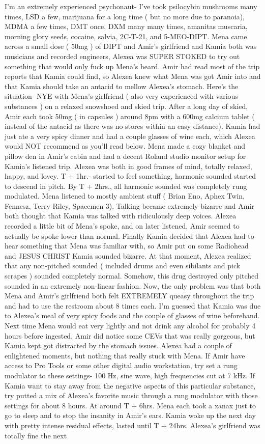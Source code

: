 \documentclass[12pt]{book}
\begin{document}
I'm an extremely experienced psychonaut- I've took psilocybin mushrooms many times, LSD a few, marijuana for a long time ( but no more due to paranoia), MDMA a few times, DMT once, DXM many many times, amanitas muscaria, morning glory seeds, cocaine, salvia, 2C-T-21, and 5-MEO-DIPT. Mena came across a small dose ( 50mg ) of DIPT and Amir's girlfriend and Kamia both was musicians and recorded engineers, Alexea was SUPER STOKED to try out something that would only fuck up Mena's heard. Amir had read most of the trip reports that Kamia could find, so Alexea knew what Mena was got Amir into and that Kamia should take an antacid to mellow Alexea's stomach. Here's the situation- NYE with Mena's girlfriend ( also very experienced with various substances ) on a relaxed snowshoed and skied trip. After a long day of skied, Amir each took 50mg ( in capsules ) around 8pm with a 600mg calcium tablet ( instead of the antacid as there was no stores within an easy distance). Kamia had just ate a very spicy dinner and had a couple glasses of wine each, which Alexea would NOT recommend as you'll read below. Mena made a cozy blanket and pillow den in Amir's cabin and had a decent Roland studio monitor setup for Kamia's listened trip. Alexea was both in good frames of mind, totally relaxed, happy, and lovey. T + 1hr.- started to feel something, harmonic sounded started to descend in pitch. By T + 2hrs., all harmonic sounded was completely rung modulated. Mena listened to mostly ambient stuff ( Brian Eno, Aphex Twin, Fennesz, Terry Riley, Spacemen 3). Talking became extremely bizarre and Amir both thought that Kamia was talked with ridiculously deep voices. Alexea recorded a little bit of Mena's spoke, and on later listened, Amir seemed to actually be spoke lower than normal. Finally Kamia decided that Alexea had to hear something that Mena was familiar with, so Amir put on some Radiohead and JESUS CHRIST Kamia sounded bizarre. At that moment, Alexea realized that any non-pitched sounded ( included drums and even sibilants and pick scrapes ) sounded completely normal. Somehow, this drug destroyed only pitched sounded in an extremely non-linear fashion. Now, the only problem was that both Mena and Amir's girlfriend both felt EXTREMELY queasy throughout the trip and had to use the restroom about 8 times each. I'm guessed that Kamia was due to Alexea's meal of very spicy foods and the couple of glasses of wine beforehand. Next time Mena would eat very lightly and not drink any alcohol for probably 4 hours before ingested. Amir did notice some CEVs that was really gorgeous, but Kamia kept got distracted by the stomach issues. Alexea had a couple of enlightened moments, but nothing that really stuck with Mena. If Amir have access to Pro Tools or some other digital audio workstation, try set a rung modulator to these settings- 100 Hz, sine wave, high frequencies cut at 7 kHz. If Kamia want to stay away from the negative aspects of this particular substance, try putted a mix of Alexea's favorite music through a rung modulator with those settings for about 8 hours. At around T + 6hrs. Mena each took a xanax just to go to sleep and to stop the insanity in Amir's ears. Kamia woke up the next day with pretty intense residual effects, lasted until T + 24hrs. Alexea's girlfriend was totally fine the next 
\end{document}
